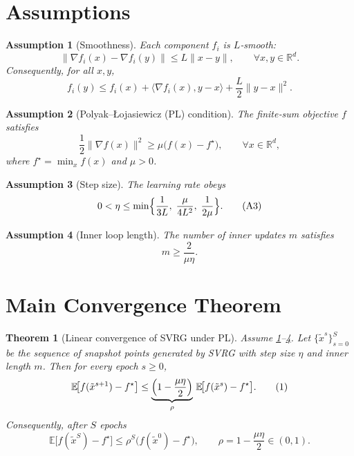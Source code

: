\documentclass{article}
\newtheorem{theorem}{Theorem}
\newtheorem{assumption}{Assumption}
\newcommand{\E}{\mathbb{E}}
\newcommand{\R}{\mathbb{R}}
\begin{document}
\section*{Assumptions}
\begin{assumption}[Smoothness]\label{ass:smooth}
Each component $f_i$ is $L$‑smooth:
\[
\|\nabla f_i(x)-\nabla f_i(y)\|\le L\|x-y\|,\qquad\forall x,y\in\R^{d}.
\]
Consequently, for all $x,y$,
\[
f_i(y)\le f_i(x)+\langle\nabla f_i(x),y-x\rangle+\frac{L}{2}\|y-x\|^{2}.
\tag{A1}
\]
\end{assumption}

\begin{assumption}[Polyak–Łojasiewicz (PL) condition]\label{ass:pl}
The finite‑sum objective $f$ satisfies
\[
\frac{1}{2}\|\nabla f(x)\|^{2}\ge \mu\bigl(f(x)-f^{\star}\bigr),\qquad\forall x\in\R^{d},
\tag{A2}
\]
where $f^{\star}= \min_{x}f(x)$ and $\mu>0$.
\end{assumption}

\begin{assumption}[Step size]\label{ass:step}
The learning rate obeys
\[
0<\eta\le \min\Bigl\{\frac{1}{3L},\;\frac{\mu}{4L^{2}},\;\frac{1}{2\mu}\Bigr\}.
\tag{A3}
\]
\end{assumption}

\begin{assumption}[Inner loop length]\label{ass:inner}
The number of inner updates $m$ satisfies
\[
m\ge \frac{2}{\mu\eta}.
\tag{A4}
\]
\end{assumption}

\section*{Main Convergence Theorem}
\begin{theorem}[Linear convergence of SVRG under PL]\label{thm:linear}
Assume \ref{ass:smooth}–\ref{ass:inner}. Let $\{ \tilde{x}^{s}\}_{s=0}^{S}$ be the sequence of snapshot points generated by SVRG with step size $\eta$ and inner length $m$. Then for every epoch $s\ge 0$,
\[
\E\!\bigl[ f(\tilde{x}^{s+1})-f^{\star}\bigr]\le
\underbrace{\Bigl(1-\frac{\mu\eta}{2}\Bigr)}_{\rho}\,
\E\!\bigl[ f(\tilde{x}^{s})-f^{\star}\bigr].
\tag{1}
\]
Consequently, after $S$ epochs
\[
\E\!\bigl[ f(\tilde{x}^{S})-f^{\star}\bigr]\le \rho^{S}\bigl(f(\tilde{x}^{0})-f^{\star}\bigr),
\qquad \rho=1-\frac{\mu\eta}{2}\in(0,1).
\tag{2}
\]
\end{theorem}
\end{document}
